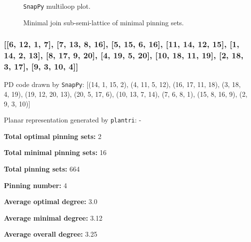 \documentclass{article}%
\begin{document}
\begin{multicols}{2}
\begin{figure}[H]
\centering

\caption{\texttt{SnapPy} multiloop plot.}
\label{fig:tex/img/[[14, 20, 1, 15], [15, 6, 16, 5], [13, 4, 14, 5], [9, 19, 10, 20], [1, 10, 2, 11], [6, 11, 7, 12], [16, 12, 17, 13], [8, 3, 9, 4], [18, 2, 19, 3], [7, 18, 8, 17]].svg}
\end{figure}
\columnbreak

\begin{figure}[H]
\centering
\scalebox{0.8}{}
\caption{Minimal join sub-semi-lattice of minimal pinning sets.}
\label{fig:tex/img/[[14, 20, 1, 15], [15, 6, 16, 5], [13, 4, 14, 5], [9, 19, 10, 20], [1, 10, 2, 11], [6, 11, 7, 12], [16, 12, 17, 13], [8, 3, 9, 4], [18, 2, 19, 3], [7, 18, 8, 17]].pgf}
\end{figure}
\end{multicols}

\newpage

\subsubsection{[[6, 12, 1, 7], [7, 13, 8, 16], [5, 15, 6, 16], [11, 14, 12, 15], [1, 14, 2, 13], [8, 17, 9, 20], [4, 19, 5, 20], [10, 18, 11, 19], [2, 18, 3, 17], [9, 3, 10, 4]]}

{\small\noindent PD code drawn by \texttt{SnapPy}: [(14, 1, 15, 2), (4, 11, 5, 12), (16, 17, 11, 18), (3, 18, 4, 19), (19, 12, 20, 13), (20, 5, 17, 6), (10, 13, 7, 14), (7, 6, 8, 1), (15, 8, 16, 9), (2, 9, 3, 10)]}

{\small\noindent Planar representation generated by \texttt{plantri}: -}

\begin{multicols}{2}
{\normalsize \noindent\textbf{Total optimal pinning sets:} 2

\noindent\textbf{Total minimal pinning sets:} 16

\noindent\textbf{Total pinning sets:} 664

\noindent\textbf{Pinning number:} 4

}
\columnbreak

{\normalsize \noindent\textbf{Average optimal degree:} 3.0

\noindent\textbf{Average minimal degree:} 3.12

\noindent\textbf{Average overall degree:} 3.25

}
\end{multicols}
\end{document}
